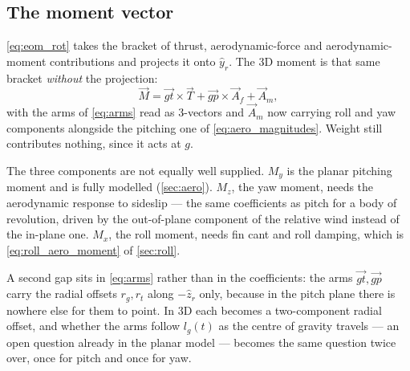 \subsection{The moment vector}\label{sec:3d_moment}
\autoref{eq:eom_rot} takes the bracket of thrust, aerodynamic-force and aerodynamic-moment
contributions and projects it onto $\hat{y}_r$. The 3D moment is that same bracket \emph{without}
the projection:
\begin{equation} \label{eq:moment_3d}
    \vec{M} = \vec{gt}\times\vec{T} + \vec{gp}\times\vec{A}_f + \vec{A}_m,
\end{equation}
with the arms of \autoref{eq:arms} read as 3-vectors and $\vec{A}_m$ now carrying roll and yaw
components alongside the pitching one of \autoref{eq:aero_magnitudes}. Weight still contributes
nothing, since it acts at $g$.

The three components are not equally well supplied. $M_y$ is the planar pitching moment and is
fully modelled (\autoref{sec:aero}). $M_z$, the yaw moment, needs the aerodynamic response to
sideslip --- the same coefficients as pitch for a body of revolution, driven by the out-of-plane
component of the relative wind instead of the in-plane one. $M_x$, the roll moment, needs fin cant
and roll damping, which is \autoref{eq:roll_aero_moment} of \autoref{sec:roll}.

A second gap sits in \autoref{eq:arms} rather than in the coefficients: the arms
$\vec{gt},\vec{gp}$ carry the radial offsets $r_g,r_t$ along $-\hat{z}_r$ only, because in the
pitch plane there is nowhere else for them to point. In 3D each becomes a two-component radial
offset, and whether the arms follow $l_g(t)$ as the centre of gravity travels --- an open question
already in the planar model --- becomes the same question twice over, once for pitch and once for
yaw.

